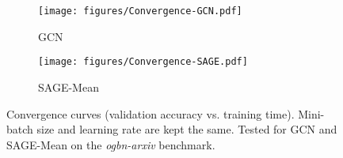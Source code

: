 \documentclass{article}
\begin{document}
\begin{figure}[t]
    \centering
    \begin{subfigure}[b]{0.48\textwidth}
        \centering
        \texttt{[image: figures/Convergence-GCN.pdf]}
        \caption{GCN}
        \label{fig:efficiency-convergence-gcn}
    \end{subfigure}
    \hfill
    \begin{subfigure}[b]{0.48\textwidth}
        \centering
        \texttt{[image: figures/Convergence-SAGE.pdf]}
        \caption{SAGE-Mean}
        \label{fig:efficiency-convergence-sage}
    \end{subfigure}
    \vspace{-5pt}
    \caption{\label{fig:efficiency-converge}Convergence curves (validation accuracy vs. training time). Mini-batch size and learning rate are kept the same. Tested for GCN and SAGE-Mean on the \textit{ogbn-arxiv} benchmark.}
\end{figure}
\end{document}
